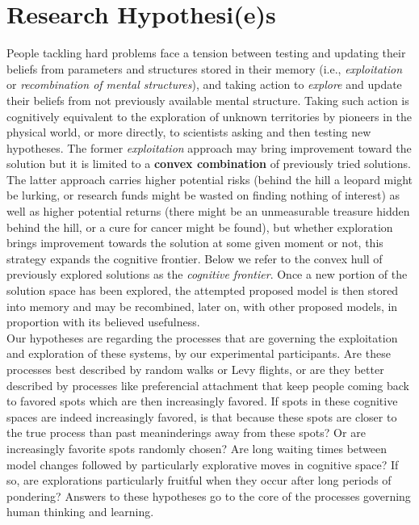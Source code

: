 \section{Research Hypothesi(e)s}

People tackling hard problems face a tension between testing and updating their beliefs from parameters and structures stored in their memory (i.e., {\it exploitation} or {\it recombination of mental structures}), and taking action to {\it explore} and update their beliefs from not previously available mental structure. Taking such action is cognitively equivalent to the exploration of unknown territories by pioneers in the physical world, or more directly, to scientists asking and then testing new hypotheses. The former {\it exploitation} approach may bring improvement toward the solution but it is limited to a {\bf convex combination} of previously tried solutions. The latter approach carries higher potential risks (behind the hill a leopard might be lurking, or research funds might be wasted on finding nothing of interest) as well as higher potential returns (there might be an unmeasurable treasure hidden behind the hill, or a cure for cancer might be found), but whether exploration brings improvement towards the solution at some given moment or not, this strategy expands the cognitive frontier. Below we refer to the convex hull of previously explored solutions as the {\it cognitive frontier}.  Once a new portion of the solution space has been explored, the attempted proposed model is then stored into memory and may be recombined, later on, with other proposed models, in proportion with its believed usefulness. 
\\

Our hypotheses are regarding the processes that are governing the exploitation and exploration of these systems, by our experimental participants.  Are these processes best described by random walks or Levy flights, or are they better described by processes like preferencial attachment that keep people coming back to favored spots which are then increasingly favored.  If spots in these cognitive spaces are indeed increasingly favored, is that because these spots are closer to the true process than past meaninderings away from these spots?  Or are increasingly favorite spots randomly chosen? Are long waiting times between model changes followed by particularly explorative moves in cognitive space?  If so, are explorations particularly fruitful when they occur after long periods of pondering?  Answers to these hypotheses go to the core of the processes governing human thinking and learning.      

